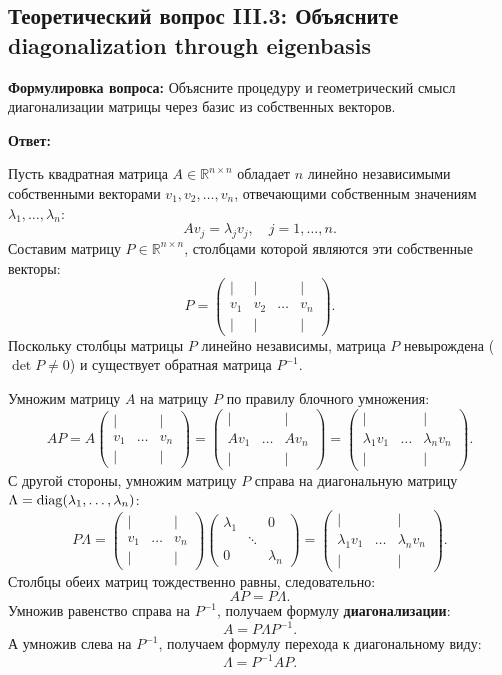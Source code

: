 
    \subsection{Теоретический вопрос III.3: Объясните diagonalization through eigenbasis}
\textbf{Формулировка вопроса:} Объясните процедуру и геометрический смысл диагонализации матрицы через базис из
собственных векторов.

\textbf{Ответ:}

Пусть квадратная матрица $A \in \mathbb{R}^{n \times n}$ обладает $n$ линейно независимыми собственными векторами $v_1,
v_2, \dots, v_n$, отвечающими собственным значениям $\lambda_1, \dots, \lambda_n$: \[ A v_j = \lambda_j v_j, \quad j =
1, \dots, n.
\] Составим матрицу $P \in \mathbb{R}^{n \times n}$, столбцами которой являются эти собственные векторы: \[ P =
\begin{pmatrix} | & | & & | \\ v_1 & v_2 & \dots & v_n \\ | & | & & |
    \end{pmatrix}. \]
Поскольку столбцы матрицы $P$ линейно независимы, матрица $P$ невырождена ($\det P \ne 0$) и существует обратная матрица
$P^{-1}$.

Умножим матрицу $A$ на матрицу $P$ по правилу блочного умножения: \[ A P = A \begin{pmatrix} | & & | \\ v_1 & \dots &
v_n \\ | & & |
    \end{pmatrix} = \begin{pmatrix}
| & & | \\ A v_1 & \dots & A v_n \\ | & & |
    \end{pmatrix} = \begin{pmatrix}
| & & | \\ \lambda_1 v_1 & \dots & \lambda_n v_n \\ | & & |
    \end{pmatrix}. \]
С другой стороны, умножим матрицу $P$ справа на диагональную матрицу $\Lambda = \operatorname{diag}(\lambda_1, \dots, \lambda_n)$: \[
P \Lambda = \begin{pmatrix} | & & | \\ v_1 & \dots & v_n \\ | & & |
    \end{pmatrix} \begin{pmatrix}
\lambda_1 & & 0 \\ & \ddots & \\ 0 & & \lambda_n
    \end{pmatrix} = \begin{pmatrix}
| & & | \\ \lambda_1 v_1 & \dots & \lambda_n v_n \\ | & & |
    \end{pmatrix}. \]
Столбцы обеих матриц тождественно равны, следовательно: \[ A P = P \Lambda.
\] Умножив равенство справа на $P^{-1}$, получаем формулу \textbf{диагонализации}: \[ A = P \Lambda P^{-1}.
\] А умножив слева на $P^{-1}$, получаем формулу перехода к диагональному виду: \[ \Lambda = P^{-1} A P. \]

